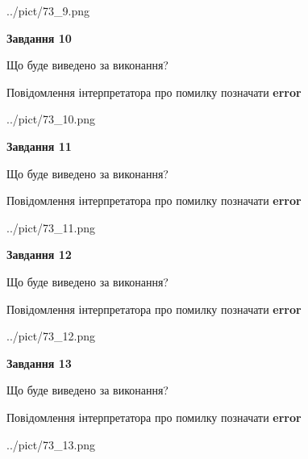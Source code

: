 \documentclass[11pt, ukrainian]{article}
\begin{document}
{\begin {large}
\begin{center}
	{../pict/73_9.png}
\end{center}
\newpage

{\begin {center}\textbf{Завдання 10}\end {center}}\par
Що буде виведено за виконання? \par
Повідомлення інтерпретатора про помилку позначати \textbf{error}

\begin{center}
	{../pict/73_10.png}
\end{center}
\newpage

{\begin {center}\textbf{Завдання 11}\end {center}}\par
Що буде виведено за виконання? \par
Повідомлення інтерпретатора про помилку позначати \textbf{error}

\begin{center}
	{../pict/73_11.png}
\end{center}
\newpage

{\begin {center}\textbf{Завдання 12}\end {center}}\par
Що буде виведено за виконання? \par
Повідомлення інтерпретатора про помилку позначати \textbf{error}

\begin{center}
	{../pict/73_12.png}
\end{center}
\newpage

{\begin {center}\textbf{Завдання 13}\end {center}}\par
Що буде виведено за виконання? \par
Повідомлення інтерпретатора про помилку позначати \textbf{error}

\begin{center}
	{../pict/73_13.png}
\end{center}
\newpage


\end{large}}
\end{document}
